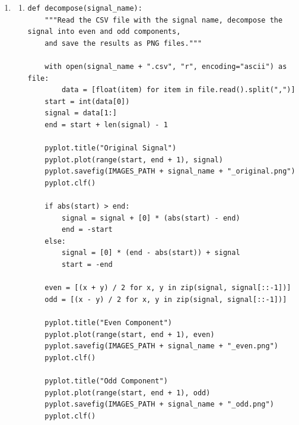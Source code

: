 \documentclass[10pt,a4paper, margin=1in]{article}
\begin{document}
\begin{enumerate}
\item %
    \begin{enumerate}
    \item \hfill\begin{verbatim}
def decompose(signal_name):
    """Read the CSV file with the signal name, decompose the signal into even and odd components,
    and save the results as PNG files."""

    with open(signal_name + ".csv", "r", encoding="ascii") as file:
        data = [float(item) for item in file.read().split(",")]
    start = int(data[0])
    signal = data[1:]
    end = start + len(signal) - 1

    pyplot.title("Original Signal")
    pyplot.plot(range(start, end + 1), signal)
    pyplot.savefig(IMAGES_PATH + signal_name + "_original.png")
    pyplot.clf()

    if abs(start) > end:
        signal = signal + [0] * (abs(start) - end)
        end = -start
    else:
        signal = [0] * (end - abs(start)) + signal
        start = -end

    even = [(x + y) / 2 for x, y in zip(signal, signal[::-1])]
    odd = [(x - y) / 2 for x, y in zip(signal, signal[::-1])]

    pyplot.title("Even Component")
    pyplot.plot(range(start, end + 1), even)
    pyplot.savefig(IMAGES_PATH + signal_name + "_even.png")
    pyplot.clf()

    pyplot.title("Odd Component")
    pyplot.plot(range(start, end + 1), odd)
    pyplot.savefig(IMAGES_PATH + signal_name + "_odd.png")
    pyplot.clf()
\end{verbatim}


\end{enumerate}
\end{enumerate}
\end{document}
